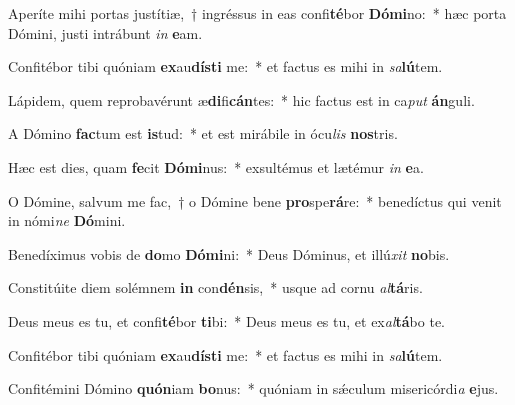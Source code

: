 \item Aperíte mihi portas justítiæ,~† ingréssus in eas confi\textbf{té}bor \textbf{Dó}\textbf{mi}no:~* hæc porta Dómini, justi intrábunt \textit{in} \textbf{e}am.
\item Confitébor tibi quóniam \textbf{ex}au\textbf{dís}\textbf{ti} me:~* et factus es mihi in \textit{sa}\textbf{lú}tem.
\item Lápidem, quem reprobavérunt æ\textbf{di}fi\textbf{cán}tes:~* hic factus est in ca\textit{put} \textbf{án}guli.
\item A Dómino \textbf{fac}tum est \textbf{is}tud:~* et est mirábile in ócu\textit{lis} \textbf{nos}tris.
\item Hæc est dies, quam \textbf{fe}cit \textbf{Dó}\textbf{mi}nus:~* exsultémus et lætémur \textit{in} \textbf{e}a.
\item O Dómine, salvum me fac,~† o Dómine bene \textbf{pro}spe\textbf{rá}re:~* benedíctus qui venit in nómi\textit{ne} \textbf{Dó}mini.
\item Benedíximus vobis de \textbf{do}mo \textbf{Dó}\textbf{mi}ni:~* Deus Dóminus, et illú\textit{xit} \textbf{no}bis.
\item Constitúite diem solémnem \textbf{in} con\textbf{dén}sis,~* usque ad cornu \textit{al}\textbf{tá}ris.
\item Deus meus es tu, et confi\textbf{té}bor \textbf{ti}bi:~* Deus meus es tu, et ex\textit{al}\textbf{tá}bo te.
\item Confitébor tibi quóniam \textbf{ex}au\textbf{dís}\textbf{ti} me:~* et factus es mihi in \textit{sa}\textbf{lú}tem.
\item Confitémini Dómino \textbf{quón}iam \textbf{bo}nus:~* quóniam in sǽculum misericórdi\textit{a} \textbf{e}jus.
